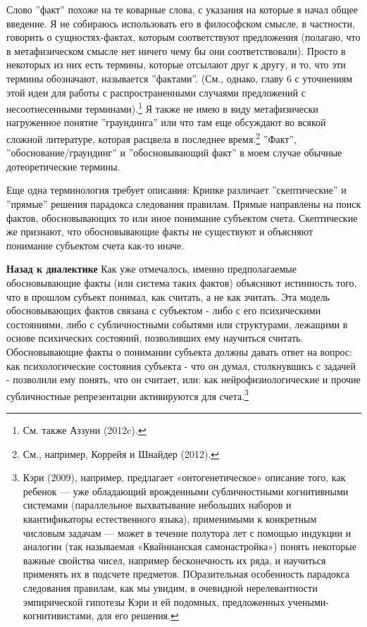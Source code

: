 \documentclass[12pt]{book}
\begin{document}
Слово ''факт'' похоже на те коварные слова, с указания на которые я начал общее введение. Я не собираюсь использовать его в философском смысле, в частности, говорить о сущностях-фактах, которым соответствуют предложения (полагаю, что в метафизическом смысле нет ничего чему бы они соответствовали). Просто в некоторых из них есть термины, которые отсылают друг к другу, и то, что эти термины обозначают, называется ''фактами''. (См., однако, главу 6 с уточнениям этой идеи для работы с распространенными случаями предложений с несоотнесенными терминами).\footnote{См. также Аззуни (2012c).} Я также не имею в виду метафизически нагруженное понятие ''граундинга'' или что там еще обсуждают во всякой сложной литературе, которая расцвела в последнее время.\footnote{См., например, Коррейя и Шнайдер (2012).} ''Факт'', ''обоснование/граундинг'' и ''обосновывающий факт'' в моем случае обычные дотеоретические термины.

Еще одна терминология требует описания: Крипке различает ''скептические'' и ''прямые'' решения парадокса следования правилам. Прямые направлены на поиск фактов, обосновывающих то или иное понимание субъектом счета. Скептические же признают, что обосновывающие факты не существуют и объясняют понимание субъектом счета как-то иначе.

\textbf{Назад к диалектике} Как уже отмечалось, именно предполагаемые обосновывающие факты (или система таких фактов) объясняют истинность того, что в прошлом субъект понимал, как считать, а не как зчитать. Эта модель обосновывающих фактов связана с субъектом - либо с его психическими состояниями, либо с субличностными событями или структурами, лежащими в основе психических состояний, позволивших ему научиться считать. Обосновывающие факты о понимании субъекта должны давать ответ на вопрос: как психологические состояния субъекта - что он думал, столкнувшись с задачей - позволили ему понять, что он считает, или: как нейрофизиологические и прочие субличностные репрезентации активируются для счета.\footnote{Кэри (2009), например, предлагает «онтогенетическое» описание того, как ребенок — уже обладающий врожденными субличностными когнитивными системами (параллельное выхватывание небольших наборов и квантификаторы естественного языка), применимыми к конкретным числовым задачам — может в течение полутора лет с помощью индукции и аналогии (так называемая «Квайнианская самонастройка») понять некоторые важные свойства чисел, например бесконечность их ряда, и научиться применять их в подсчете предметов. ПОразительная особенность парадокса следования правилам, как мы увидим, в очевидной нерелевантности эмпирической гипотезы Кэри и ей подомных, предложенных учеными-когнитивистами, для его решения.}
\end{document}
